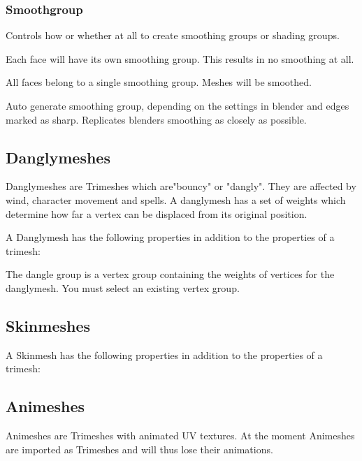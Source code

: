 \subsubsection*{Smoothgroup}
Controls how or whether at all to create smoothing groups or shading groups.
\begin{description}[leftmargin=6em,style=nextline]
    \item[Separate] Each face will have its own smoothing group. This results in no smoothing at all.
    \item[Single] All faces belong to a single smoothing group. Meshes will be smoothed.
    \item[Auto] Auto generate smoothing group, depending on the settings in blender and edges marked as sharp. Replicates blenders smoothing as closely as possible.
\end{description}

\subsection{Danglymeshes}
Danglymeshes are Trimeshes which are"bouncy" or "dangly". They are affected by
wind, character movement and spells. A danglymesh has a set of weights which
determine how far a vertex can be displaced from its original position.

A Danglymesh has the following properties in addition to the properties of a 
trimesh:
\begin{description}[leftmargin=6em,style=nextline]
    \item[Dangle group] The dangle group is a vertex group containing the weights of vertices for the danglymesh. You must select an existing vertex group.
    \item[Period]
    \item[Tightness]
    \item[Displacement]
\end{description}

\subsection{Skinmeshes}
A Skinmesh has the following properties in addition to the properties of a 
trimesh:

\subsection{Animeshes}
Animeshes are Trimeshes with animated UV textures. At the moment Animeshes
are imported as Trimeshes and will thus lose their animations.

